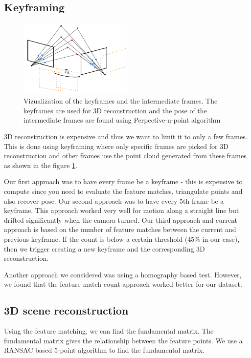 \documentclass{article}
\begin{document}
\subsection{Keyframing}

\begin{figure}
\centering
\includegraphics[width=0.5\textwidth]{./system_viz}
\caption{Vizualization of the keyframes and the intermediate frames. The keyframes are used for 3D reconstruction and the pose of the intermediate frames are found using Perpective-n-point algorithm}
\label{fig:keyframing}
\end{figure}

3D reconstruction is expensive and thus we want to limit it to only a few frames. This is done using keyframing where only specific frames are picked for 3D reconstruction and other frames use the point cloud generated from these frames as shown in the figure \ref{fig:keyframing}.

Our first approach was to have every frame be a keyframe - this is expensive to compute since you need to evaluate the feature matches, triangulate points and also recover pose. Our second approach was to have every 5th frame be a keyframe. This approach worked very well for motion along a straight line but drifted significantly when the camera turned. Our third approach and current approach is based on the number of feature matches between the current and previous keyframe. If the count is below a certain threshold (45\% in our case), then we trigger creating a new keyframe and the corresponding 3D reconstruction.

Another approach we considered was using a homography based test\cite{homography}. However, we found that the feature match count approach worked better for our dataset.

\subsection{3D scene reconstruction}
Using the feature matching, we can find the fundamental matrix. The fundamental matrix gives the relationship between the feature points. We use a RANSAC based 5-point algorithm to find the fundamental matrix.
\end{document}
